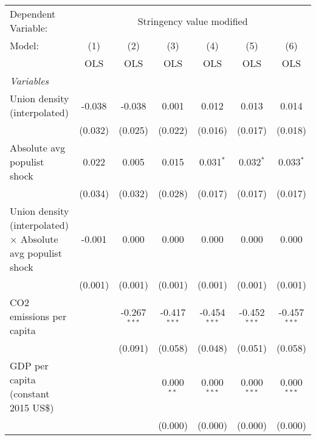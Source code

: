 
\begingroup
\centering
\begin{tabular}{lcccccc}
   \toprule
   Dependent Variable: & \multicolumn{6}{c}{Stringency value modified}\\
   Model:                                                             & (1)     & (2)            & (3)            & (4)            & (5)            & (6)\\  
                                                                      &  OLS    & OLS            & OLS            & OLS            & OLS            & OLS\\  
   \midrule
   \emph{Variables}\\
   Union density (interpolated)                                       & -0.038  & -0.038         & 0.001          & 0.012          & 0.013          & 0.014\\   
                                                                      & (0.032) & (0.025)        & (0.022)        & (0.016)        & (0.017)        & (0.018)\\   
   Absolute avg populist shock                                        & 0.022   & 0.005          & 0.015          & 0.031$^{*}$    & 0.032$^{*}$    & 0.033$^{*}$\\   
                                                                      & (0.034) & (0.032)        & (0.028)        & (0.017)        & (0.017)        & (0.017)\\   
   Union density (interpolated) $\times$ Absolute avg populist shock  & -0.001  & 0.000          & 0.000          & 0.000          & 0.000          & 0.000\\   
                                                                      & (0.001) & (0.001)        & (0.001)        & (0.001)        & (0.001)        & (0.001)\\   
   CO2 emissions per capita                                           &         & -0.267$^{***}$ & -0.417$^{***}$ & -0.454$^{***}$ & -0.452$^{***}$ & -0.457$^{***}$\\   
                                                                      &         & (0.091)        & (0.058)        & (0.048)        & (0.051)        & (0.058)\\   
   GDP per capita (constant 2015 US\$)                                &         &                & 0.000$^{**}$   & 0.000$^{***}$  & 0.000$^{***}$  & 0.000$^{***}$\\   
                                                                      &         &                & (0.000)        & (0.000)        & (0.000)        & (0.000)\\   

\end{tabular}
